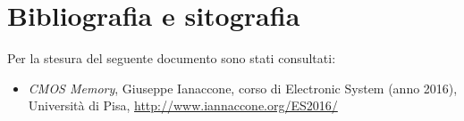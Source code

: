 \documentclass[10 pt,letterpaper,twoside,openright]{book}
\begin{document}
	
	\tableofcontents
	
	
	
	\mainmatter
	
	
	
	
	
	
	
	
	
	
	
	\backmatter
	
	
	\chapter{Bibliografia e sitografia}
	\printbibliography[heading=none]
	
	\noindent
	Per la stesura del seguente documento sono stati consultati:
	\begin{itemize}
		\item \textit{CMOS Memory}, Giuseppe Ianaccone, corso di Electronic System (anno 2016), Università di Pisa, \url{http://www.iannaccone.org/ES2016/}
	\end{itemize}
	
	
	
	
		
\end{document}
